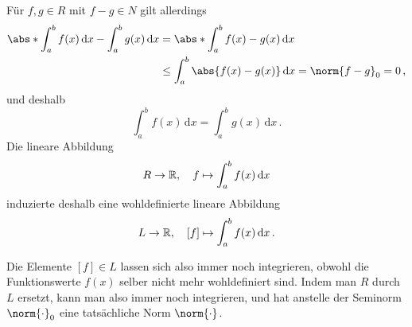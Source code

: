 Für $f, g \in R$ mit $f - g \in N$ gilt allerdings
\begin{align*}
        \abs*{ \int_a^b f(x) \,\text{d}x - \int_a^b g(x) \,\text{d}x }
  &=    \abs*{ \int_a^b f(x) - g(x) \,\text{d}x } \\
  &\leq \int_a^b \abs{f(x) - g(x)} \,\text{d}x
  =     \norm{f - g}_0
  =     0 \,,
\end{align*}
und deshalb
\[
    \int_a^b f(x) \,\text{d}x
  = \int_a^b g(x) \,\text{d}x \,.
\]
Die lineare Abbildung
\[
          R
  \to     \mathbb{R},
  \quad   f
  \mapsto \int_a^b f(x) \,\text{d}x
\]
induzierte deshalb eine wohldefinierte lineare Abbildung
\[
          L
  \to     \mathbb{R},
  \quad   [f]
  \mapsto \int_a^b f(x) \,\text{d}x \,.
\]

Die Elemente $[f] \in L$ lassen sich also immer noch integrieren, obwohl die Funktionswerte $f(x)$ selber nicht mehr wohldefiniert sind.
Indem man $R$ durch $L$ ersetzt, kann man also immer noch integrieren, und hat anstelle der Seminorm $\norm{\cdot}_0$ eine tatsächliche Norm $\norm{\cdot}$.










